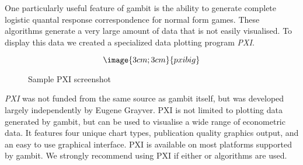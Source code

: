 One particularly useful feature of gambit is the ability to generate complete 
logistic quantal response correspondence for normal form games.  These
algorithms generate a very large amount of data that is not easily visualised.
To display this data we created a specialized data plotting program {\em PXI}.


\begin{figure}
$$\image{3cm;3cm}{pxibig}$$
\caption{Sample PXI screenshot}\label{fig:pxibig}
\end{figure}

{\em PXI} was not funded from the same source as gambit itself, but was 
developed largely independently by Eugene Grayver.  PXI is not limited to
plotting data generated by gambit, but can be used to visualise a wide range
of econometric data.  It features four unique chart types, publication quality
graphics output, and an easy to use graphical interface.  PXI is available on
most platforms supported by gambit.  We strongly recommend using PXI if
either  or  algorithms are used.





%
\setfooter{\thepage}{}{}{}{}{\thepage}%

